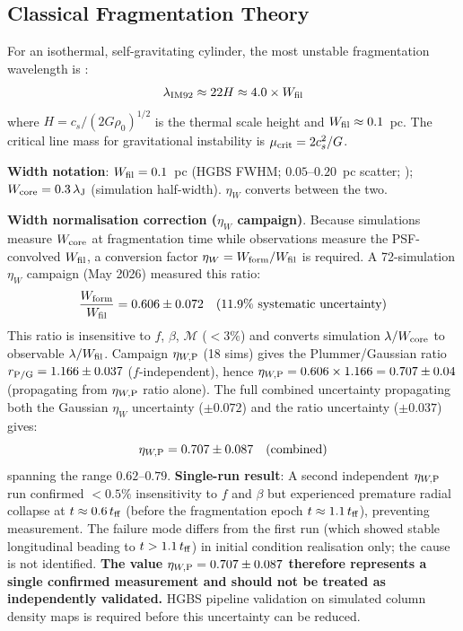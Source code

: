 \documentclass[twoside,twocolumn]{mnras}
\begin{document}
\subsection{Classical Fragmentation Theory}

For an isothermal, self-gravitating cylinder, the most unstable fragmentation wavelength
is \citep{Inutsuka1992}:
\begin{equation}
\lambda_{\rm IM92} \approx 22 H \approx 4.0 \times W_{\rm fil}
\label{eq:im92}
\end{equation}
where $H = c_s/(2G\rho_0)^{1/2}$ is the thermal scale height and $W_{\rm fil} \approx 0.1$~pc.
The critical line mass for gravitational instability is $\mu_{\rm crit} = 2c_s^2/G$.

\textbf{Width notation}: $W_{\rm fil} = 0.1$~pc (HGBS FWHM; $0.05$--$0.20$~pc scatter;
\citealt{Panopoulou2022}); $W_{\rm core} = 0.3\,\lambda_{\rm J}$ (simulation half-width).
$\eta_W$ converts between the two.

\textbf{Width normalisation correction ($\eta_W$ campaign)}.%
\label{sec:width_correction}
Because simulations measure $W_{\rm core}$ at fragmentation time while observations
measure the PSF-convolved $W_{\rm fil}$, a conversion factor $\eta_W = W_{\rm form}/W_{\rm fil}$ is required.
A 72-simulation $\eta_W$ campaign (May 2026) measured this ratio:
\begin{equation}
\frac{W_{\rm form}}{W_{\rm fil}} = 0.606 \pm 0.072 \quad (11.9\% \text{ systematic uncertainty})
\label{eq:t1_correction}
\end{equation}
This ratio is insensitive to $f$, $\beta$, $\mathcal{M}$ ($<3\%$) and converts
simulation $\lambda/W_{\rm core}$ to observable $\lambda/W_{\rm fil}$. Campaign $\eta_{W,{\rm P}}$
(18 sims) gives the Plummer/Gaussian ratio $r_{\rm P/G} = 1.166 \pm 0.037$
($f$-independent), hence $\eta_{W,{\rm P}} = 0.606 \times 1.166 = 0.707 \pm 0.04$
(propagating from $\eta_{W,{\rm P}}$ ratio alone). The full combined uncertainty propagating
both the Gaussian $\eta_W$ uncertainty ($\pm 0.072$) and the ratio uncertainty
($\pm 0.037$) gives:
\begin{equation}
\eta_{W,{\rm P}} = 0.707 \pm 0.087 \quad \text{(combined)}
\label{eq:etaW_combined}
\end{equation}
spanning the range $0.62$--$0.79$. \textbf{Single-run result}: A second independent $\eta_{W,{\rm P}}$ run
confirmed $<0.5\%$ insensitivity to $f$ and $\beta$ but experienced premature radial
collapse at $t \approx 0.6\,t_{\rm ff}$ (before the fragmentation epoch $t \approx 1.1\,t_{\rm ff}$),
preventing measurement. The failure mode differs from the first run (which showed stable
longitudinal beading to $t > 1.1\,t_{\rm ff}$) in initial condition realisation only;
the cause is not identified. \textbf{The value $\eta_{W,{\rm P}} = 0.707 \pm 0.087$ therefore
represents a single confirmed measurement and should not be treated as independently
validated.} HGBS pipeline validation on simulated column density maps is required
before this uncertainty can be reduced.
\end{document}
